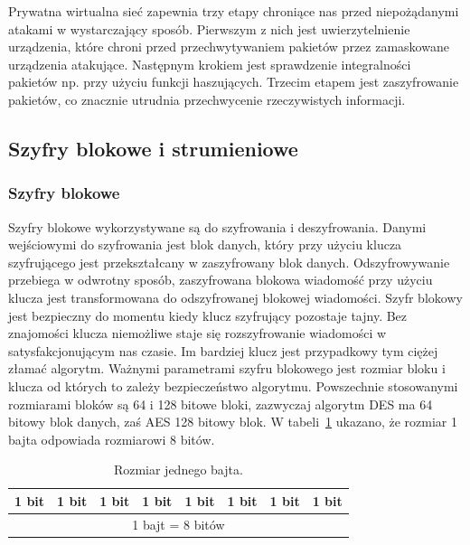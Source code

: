 \documentclass[12p]{article}
\begin{document}
\begin{itemize}
\quad Prywatna wirtualna sieć zapewnia trzy etapy chroniące nas przed niepożądanymi atakami w wystarczający sposób. Pierwszym z nich jest uwierzytelnienie urządzenia, które chroni przed przechwytywaniem pakietów przez zamaskowane urządzenia atakujące. Następnym krokiem jest sprawdzenie integralności pakietów np. przy użyciu funkcji haszujących. Trzecim etapem jest zaszyfrowanie pakietów, co znacznie utrudnia przechwycenie rzeczywistych informacji.
\end{itemize}



\subsection{Szyfry blokowe i strumieniowe}
\subsubsection{Szyfry blokowe} 
\quad Szyfry blokowe wykorzystywane są do szyfrowania i deszyfrowania. Danymi wejściowymi do szyfrowania jest blok danych, który przy użyciu klucza szyfrującego jest przekształcany w zaszyfrowany blok danych. Odszyfrowywanie przebiega w odwrotny sposób, zaszyfrowana blokowa wiadomość przy użyciu klucza jest transformowana do odszyfrowanej blokowej wiadomości. Szyfr blokowy jest bezpieczny do momentu kiedy klucz szyfrujący pozostaje tajny. Bez znajomości klucza niemożliwe staje się rozszyfrowanie wiadomości w satysfakcjonującym nas czasie. Im bardziej klucz jest przypadkowy tym ciężej złamać algorytm. Ważnymi parametrami szyfru blokowego jest rozmiar bloku i klucza od których to zależy bezpieczeństwo algorytmu. Powszechnie stosowanymi rozmiarami bloków są 64 i 128 bitowe bloki, zazwyczaj algorytm DES ma 64 bitowy blok danych, zaś AES 128 bitowy blok. W tabeli~\ref{bajt} ukazano, że rozmiar 1 bajta odpowiada rozmiarowi 8 bitów.
\begin{table}[H]
\centering
\begin{tabular}{|r|r|r|c|c|l|l|l|}
\hline
1 bit & 1 bit & 1 bit & 1 bit & 1 bit & 1 bit & 1 bit & 1 bit\\
\hline
\multicolumn{8}{|c|}{1 bajt = 8 bitów}\\
\hline
\end{tabular}
\caption{Rozmiar jednego bajta.}\label{bajt}
\end{table}
\end{document}
